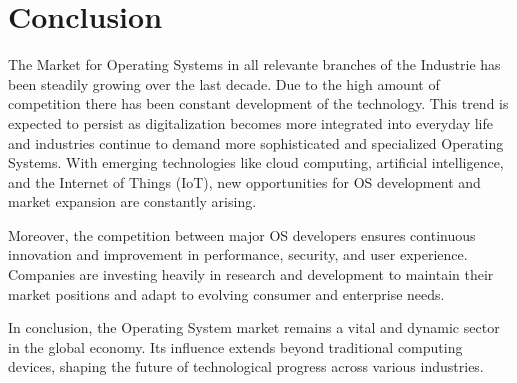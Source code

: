 \cite{WindriverSold}
\cite{Windriver}


\section{Conclusion}

The Market for Operating Systems in all relevante branches of the Industrie has been steadily growing over the last decade.
Due to the high amount of competition there has been constant development of the technology. 
This trend is expected to persist as digitalization becomes more integrated into everyday life and industries continue to demand more sophisticated and specialized Operating Systems. With emerging technologies like cloud computing, artificial intelligence, and the Internet of Things (IoT), new opportunities for OS development and market expansion are constantly arising.

Moreover, the competition between major OS developers ensures continuous innovation and improvement in performance, security, and user experience. Companies are investing heavily in research and development to maintain their market positions and adapt to evolving consumer and enterprise needs.

In conclusion, the Operating System market remains a vital and dynamic sector in the global economy. Its influence extends beyond traditional computing devices, shaping the future of technological progress across various industries.

\author{Florian Prandstetter}
